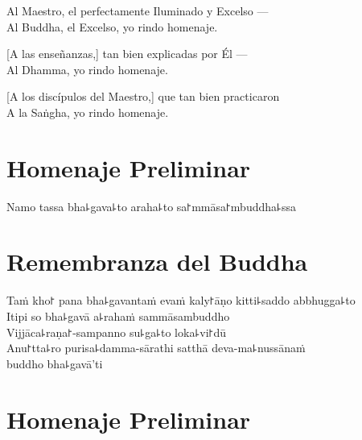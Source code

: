 Al Maestro, el perfectamente Iluminado y Excelso ---\\
Al Buddha, el Excelso, yo rindo homenaje. 

[A las enseñanzas,] tan bien explicadas por Él ---\\
Al Dhamma, yo rindo homenaje. 

[A los discípulos del Maestro,] que tan bien practicaron\\
A la Saṅgha, yo rindo homenaje. 

\clearpage

\chapter*{Homenaje Preliminar}

\begin{leader}
\end{leader}

Namo tassa bha꜕gava꜕to araha꜕to sa꜓mmāsa꜓mbuddha꜕ssa


\chapter*{Remembranza del Buddha}

\delegateSetUseNext

\begin{leader}
\end{leader}

Taṁ kho꜓ pana bha꜕gavantaṁ evaṁ kaly꜓āṇo kitti꜕saddo abbhugga꜕to\\
Itipi so bha꜕gavā a꜕rahaṁ sammāsambuddho\\
Vijjāca꜕raṇa꜓-sampanno su꜕ga꜕to loka꜕vi꜓dū\\
Anu꜓tta꜕ro purisa꜕damma-sārathi satthā deva-ma꜕nussānaṁ\\
\vin buddho bha꜕gavā'ti

\clearpage

\chapter{Homenaje Preliminar}

\begin{leader}
\end{leader}

